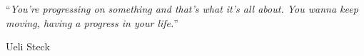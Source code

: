 \thispagestyle{empty}




\vspace*{0.2\textheight}

\noindent\enquote{\itshape You're progressing on something and that's what it's all about. You wanna keep moving, having a progress in your life.}\bigbreak

\hfill Ueli Steck